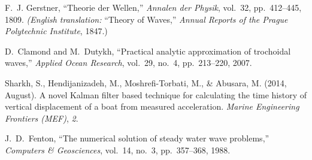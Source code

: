 \documentclass[11pt,letterpaper]{article}
\begin{document}
\begin{thebibliography}{4}

F.~J. Gerstner, ``Theorie der Wellen,'' 
\emph{Annalen der Physik}, vol.~32, pp.~412–445, 1809.  
\emph{(English translation: }``Theory of Waves,'' \emph{Annual Reports of the Prague Polytechnic Institute}, 1847.)

D.~Clamond and M.~Dutykh, ``Practical analytic approximation of trochoidal waves,'' 
\emph{Applied Ocean Research}, vol.~29, no.~4, pp.~213–220, 2007.

Sharkh, S., Hendijanizadeh, M., Moshrefi-Torbati, M., \& Abusara, M. (2014, August). 
A novel Kalman filter based technique for calculating the time history of vertical displacement of a boat from measured acceleration. 
\textit{Marine Engineering Frontiers (MEF)}, \textit{2}.

J.~D.~Fenton, “The numerical solution of steady water wave problems,” \emph{Computers \& Geosciences}, vol.~14, no.~3, pp.~357–368, 1988.

\end{thebibliography}
\end{document}
